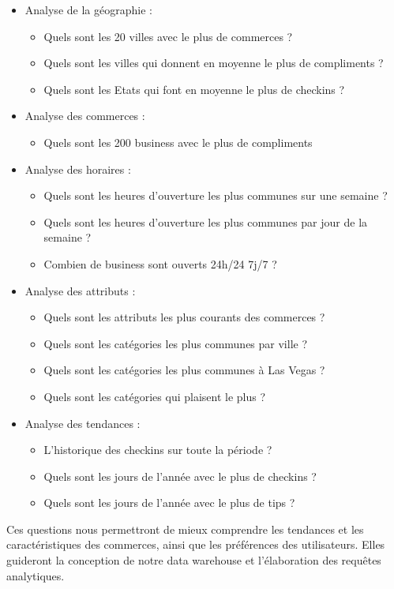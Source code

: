 \begin{itemize}
\item Analyse de la géographie :
\begin{itemize}
\item Quels sont les 20 villes avec le plus de commerces ?
\item Quels sont les villes qui donnent en moyenne le plus de compliments ?
\item Quels sont les Etats qui font en moyenne le plus de checkins ?
\end{itemize}
\item Analyse des commerces :
\begin{itemize}
\item Quels sont les 200 business avec le plus de compliments
\end{itemize}
\item Analyse des horaires :
\begin{itemize}
\item Quels sont les heures d'ouverture les plus communes sur une semaine ?
\item Quels sont les heures d'ouverture les plus communes par jour de la semaine ?
\item Combien de business sont ouverts 24h/24 7j/7 ?
\end{itemize}
\item Analyse des attributs :
\begin{itemize}
\item Quels sont les attributs les plus courants des commerces ?
\item Quels sont les catégories les plus communes par ville ?
\item Quels sont les catégories les plus communes à Las Vegas ?
\item Quels sont les catégories qui plaisent le plus ?
\end{itemize}
\item Analyse des tendances :
\begin{itemize}
\item L'historique des checkins sur toute la période ?
\item Quels sont les jours de l'année avec le plus de checkins ?
\item Quels sont les jours de l'année avec le plus de tips ?
\end{itemize}
\end{itemize}

Ces questions nous permettront de mieux comprendre les tendances et les caractéristiques des commerces, ainsi que les préférences des utilisateurs.
Elles guideront la conception de notre data warehouse et l’élaboration des requêtes analytiques.


